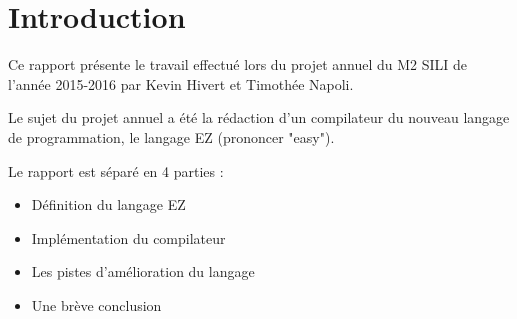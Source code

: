 \section{Introduction}

Ce rapport présente le travail effectué lors du projet annuel du M2 SILI
de l'année 2015-2016 par Kevin Hivert et Timothée Napoli.

Le sujet du projet annuel a été la rédaction d'un compilateur du nouveau
langage de programmation, le langage EZ (prononcer "easy").

Le rapport est séparé en 4 parties :
\begin{itemize}
    \item Définition du langage EZ
    \item Implémentation du compilateur
    \item Les pistes d'amélioration du langage
    \item Une brève conclusion
\end{itemize}

